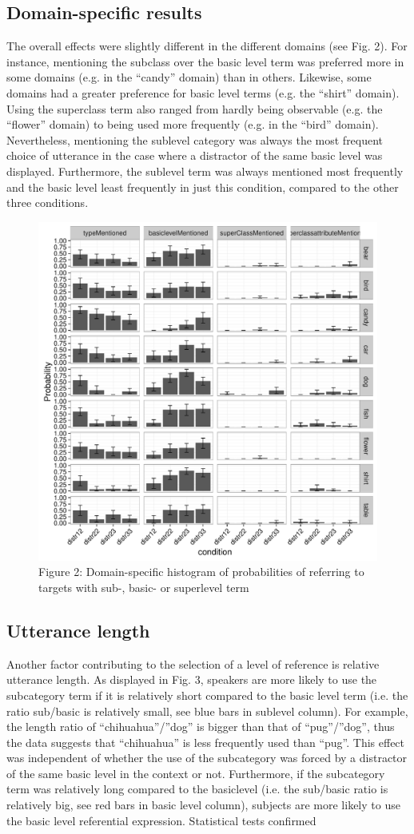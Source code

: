 \documentclass[10pt,letterpaper]{article}
\begin{document}
\subsection{\bf Domain-specific results}
The overall effects were slightly different in the different domains (see Fig. 2). For instance, mentioning the subclass over the basic level term was preferred more in some domains (e.g. in the ``candy'' domain) than in others. Likewise, some domains had a greater preference for basic level terms (e.g. the ``shirt'' domain). Using the superclass term also ranged from hardly being observable (e.g. the ``flower'' domain) to being used more frequently (e.g. in the ``bird'' domain). Nevertheless, mentioning the sublevel category was always the most frequent choice of utterance in the case where a distractor of the same basic level was displayed. Furthermore, the sublevel term was always mentioned most frequently and the basic level least frequently in just this condition, compared to the other three conditions.

\begin{figure}[ht!]
\centering
\includegraphics[width=.5\textwidth]{graphs/proportion_mentioned_features_by_domain}
\caption{Figure 2: Domain-specific histogram of probabilities of referring to targets with sub-, basic- or superlevel term \label{overflow}}
\end{figure}

\subsection{\bf Utterance length}
Another factor contributing to the selection of a level of reference is relative utterance length. As displayed in Fig. 3, speakers are more likely to use the subcategory term if it is relatively short compared to the basic level term (i.e. the ratio sub/basic is relatively small, see blue bars in sublevel column). For example, the length ratio of ``chihuahua''/''dog'' is bigger than that of ``pug''/''dog'', thus the data suggests that ``chihuahua'' is less frequently used than ``pug''. This effect was independent of whether the use of the subcategory was forced by a distractor of the same basic level in the context or not. Furthermore, if the subcategory term was relatively long compared to the basiclevel (i.e. the sub/basic ratio is relatively big, see red bars in basic level column), subjects are more likely to use the basic level referential expression. Statistical tests confirmed
\end{document}
